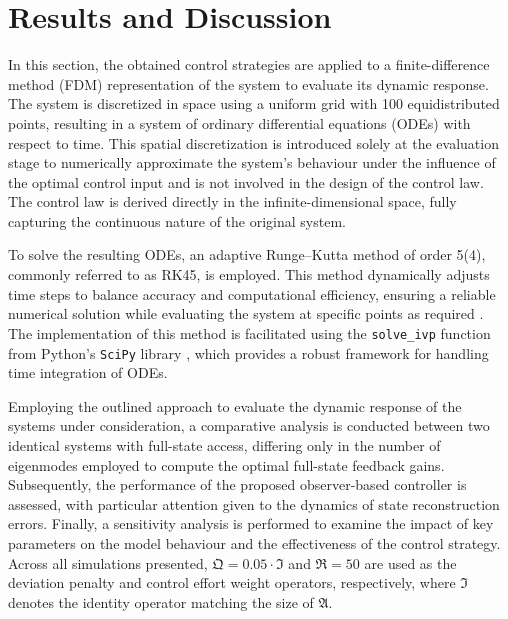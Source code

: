 \section{Results and Discussion} \label{sec:1_results}

In this section, the obtained control strategies are applied to a finite-difference method (FDM) representation of the system to evaluate its dynamic response. The system is discretized in space using a uniform grid with 100 equidistributed points, resulting in a system of ordinary differential equations (ODEs) with respect to time. This spatial discretization is introduced solely at the evaluation stage to numerically approximate the system's behaviour under the influence of the optimal control input and is not involved in the design of the control law. The control law is derived directly in the infinite-dimensional space, fully capturing the continuous nature of the original system.

To solve the resulting ODEs, an adaptive Runge--Kutta method of order 5(4), commonly referred to as RK45, is employed. This method dynamically adjusts time steps to balance accuracy and computational efficiency, ensuring a reliable numerical solution while evaluating the system at specific points as required \autocite{Dormand1980family, Shampine1986Some}. The implementation of this method is facilitated using the \texttt{solve\_ivp} function from Python's \texttt{SciPy} library \autocite{Virtanen2020SciPy}, which provides a robust framework for handling time integration of ODEs.

Employing the outlined approach to evaluate the dynamic response of the systems under consideration, a comparative analysis is conducted between two identical systems with full-state access, differing only in the number of eigenmodes employed to compute the optimal full-state feedback gains. Subsequently, the performance of the proposed observer-based controller is assessed, with particular attention given to the dynamics of state reconstruction errors. Finally, a sensitivity analysis is performed to examine the impact of key parameters on the model behaviour and the effectiveness of the control strategy. Across all simulations presented, $\mathfrak{Q} = 0.05 \cdot \mathfrak{I}$ and $\mathfrak{R} = 50$ are used as the deviation penalty and control effort weight operators, respectively, where $\mathfrak{I}$ denotes the identity operator matching the size of $\mathfrak{A}$.

